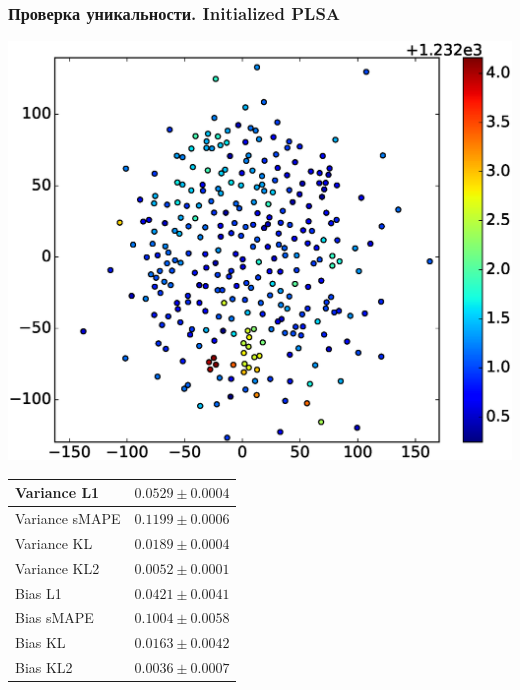 \documentclass[utf8]{beamer}
\begin{document}
	
	\begin{frame}	
	\fontsize{8pt}{15.0}\selectfont
	\frametitle{Проверка уникальности. Initialized PLSA}
	 \includegraphics[width=0.45\linewidth]{presentation_pictures/full_initialized_plsa.eps} 
    \begin{tabular}[b]{| l | l | }\hline
      Variance L1 & $0.0529 \pm 0.0004$ \\ \hline
      Variance sMAPE  & $0.1199 \pm 0.0006$ \\ \hline
      Variance KL  & $0.0189 \pm 0.0004$ \\ \hline
      Variance KL2  & $0.0052 \pm 0.0001$ \\ \hline

      Bias L1 & $0.0421 \pm 0.0041$ \\ \hline
      Bias sMAPE  & $0.1004 \pm 0.0058$ \\ \hline
      Bias KL  & $0.0163 \pm 0.0042$ \\ \hline
      Bias KL2  & $0.0036 \pm 0.0007$ \\ \hline
    \end{tabular}

	\end{frame}
	
\end{document}
